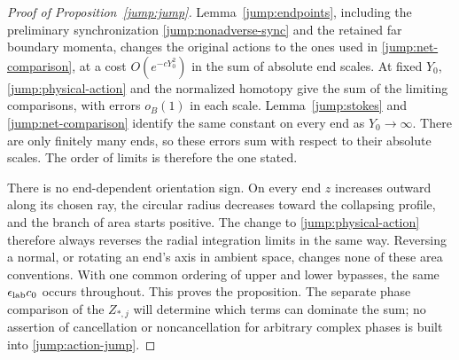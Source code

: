 \begin{proof}[Proof of Proposition~\ref{jump:jump}]
Lemma~\ref{jump:endpoints}, including the preliminary synchronization
\eqref{jump:nonadverse-sync} and the retained far boundary momenta,
changes the original actions to the
ones used in \eqref{jump:net-comparison}, at a cost
$O(e^{-cY_0^2})$ in the sum of absolute end scales.  At fixed
$Y_0$, \eqref{jump:physical-action} and the normalized homotopy
give the sum of the limiting comparisons, with errors $o_B(1)$
in each scale.  Lemma~\ref{jump:stokes} and
\eqref{jump:net-comparison} identify the same constant on every
end as $Y_0\to\infty$.  There are only finitely many ends, so
these errors sum with respect to their absolute scales.  The
order of limits is therefore the one stated.

There is no end-dependent orientation sign.  On every end $z$
increases outward along its chosen ray, the circular radius
decreases toward the collapsing profile, and the branch of area
starts positive.  The change to \eqref{jump:physical-action}
therefore always reverses the radial integration limits in the
same way.  Reversing a normal, or rotating an end's axis in
ambient space, changes none of these area conventions.  With
one common ordering of upper and lower bypasses, the same
$\epsilon_{\rm lab}c_0$ occurs throughout.  This proves the proposition.  The
separate phase comparison of the $Z_{*,j}$ will determine which
terms can dominate the sum; no assertion of cancellation or
noncancellation for arbitrary complex phases is built into
\eqref{jump:action-jump}.
\end{proof}
